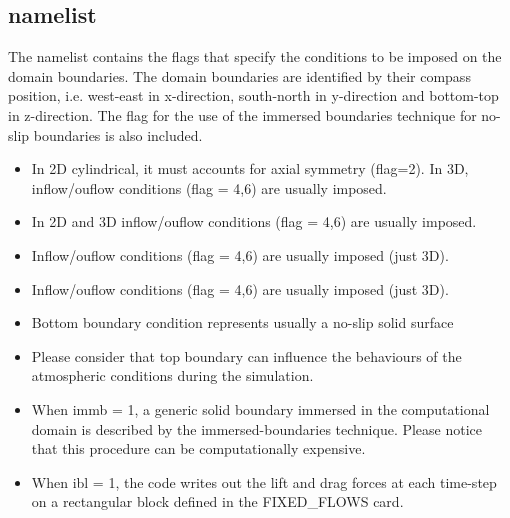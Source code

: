 \subsection{ namelist}
The  namelist contains the flags that specify the
conditions to be imposed on the domain boundaries. The domain boundaries
are identified by their compass position, i.e. west-east in x-direction,
south-north in y-direction and bottom-top in z-direction. The flag for the
use of the immersed boundaries technique for no-slip boundaries is also
included.
\begin{itemize}
\item
{}
{In 2D cylindrical, it must accounts for axial symmetry (flag=2). In 3D, 
inflow/ouflow conditions (flag = 4,6) are usually imposed.}

\item
{}
{In 2D and 3D inflow/ouflow conditions (flag = 4,6) are usually imposed.}

\item
{}
{Inflow/ouflow conditions (flag = 4,6) are usually imposed (just 3D).}

\item
{}
{Inflow/ouflow conditions (flag = 4,6) are usually imposed (just 3D).}

\item
{}
{Bottom boundary condition represents usually a no-slip solid surface}

\item
{}
{Please consider that top boundary can influence the behaviours of
the atmospheric conditions during the simulation.}

\item
{}
{When immb = 1, a generic solid boundary immersed in the computational domain
is described by the immersed-boundaries technique. Please notice that this 
procedure can be computationally expensive.}

\item
{}
{When ibl = 1, the code writes out the lift and drag forces at each time-step
on a rectangular block defined in the FIXED\_FLOWS card.}

\end{itemize}

